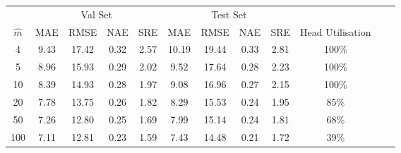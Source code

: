 \begin{tabular}{cccccccccccc} 
 \toprule
 & \multicolumn{4}{c}{Val Set} & \multicolumn{4}{c}{Test Set} & \\
 \cmidrule(r){2-5} \cmidrule(r){6-9}

$\hat{m}$ & \multicolumn{1}{c}{MAE} & \multicolumn{1}{c}{RMSE} & \multicolumn{1}{c}{NAE} & \multicolumn{1}{c}{SRE} & \multicolumn{1}{c}{MAE} & \multicolumn{1}{c}{RMSE} & \multicolumn{1}{c}{NAE} & \multicolumn{1}{c}{SRE} & Head Utilisation\\ 
\midrule
4 & 9.43 & 17.42 & 0.32 & 2.57 &10.19 & 19.44 & 0.33 & 2.81 & 100\% \\ 
5 & 8.96 & 15.93 & 0.29 & 2.02 & 9.52 & 17.64 & 0.28 & 2.23 & 100\% \\ 
10 & 8.39 & 14.93 & 0.28 & 1.97 & 9.08 & 16.96 & 0.27 & 2.15 & 100\%\\ 
20 & 7.78 & 13.75 & 0.26 & 1.82 & 8.29 & 15.53 & 0.24 & 1.95 & 85\%\\ 
50 & 7.26 & 12.80 & 0.25 & 1.69 & 7.99 & 15.14 & 0.24 & 1.81 & 68\%\\ 
100 & 7.11 & 12.81 & 0.23 & 1.59 & 7.43 & 14.48 & 0.21 & 1.72 & 39\%\\ 
 \bottomrule
\end{tabular}
 







 
 
 